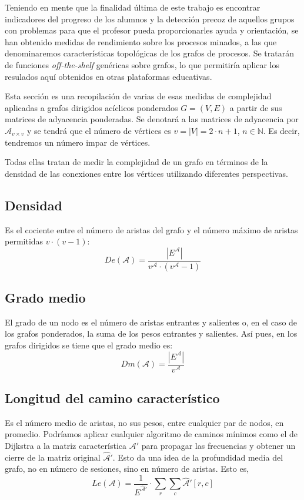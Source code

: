 Teniendo en mente que la finalidad última de este trabajo es encontrar indicadores del progreso de los alumnos y la detección precoz de aquellos grupos con problemas para que el profesor pueda proporcionarles ayuda y orientación, se han obtenido medidas de rendimiento sobre los procesos minados, a las que denominaremos características topológicas de los grafos de procesos. Se tratarán de funciones \emph{off-the-shelf} genéricas sobre grafos, lo que permitiría aplicar los resulados aquí obtenidos en otras plataformas educativas.

Esta sección es una recopilación de varias de esas medidas de complejidad \cite{cormen2022introduction} aplicadas a grafos dirigidos acíclicos ponderados $G = (V,E)$ a partir de sus matrices de adyacencia ponderadas. Se denotará a las matrices de adyacencia por $\mathcal{A}_{v\times v}$ y se tendrá que el número de vértices es $v = |V| = 2\cdot n + 1$, $n \in \mathbb{N}$. Es decir, tendremos un número impar de vértices.

Todas ellas tratan de medir la complejidad de un grafo en términos de la densidad de las conexiones entre los vértices utilizando diferentes perspectivas.

\subsection{Densidad}
Es el cociente entre el número de aristas del grafo y el número máximo de aristas permitidas $v \cdot (v-1)$:
\begin{equation}
De(\mathcal{A}) = \frac{|E^{\mathcal{A}}|}{v^{\mathcal{A}}\cdot (v^{\mathcal{A}}-1)}
\end{equation}
\subsection{Grado medio}
El grado de un nodo es el número de aristas entrantes y salientes o, en el caso de los grafos ponderados, la suma de los pesos entrantes y salientes. Así pues, en los grafos dirigidos se tiene que el grado medio es:
\begin{equation}
Dm(\mathcal{A}) = \frac{|E^{\mathcal{A}}|}{v^{\mathcal{A}}}
\end{equation}
\subsection{Longitud del camino característico}
Es el número medio de aristas, no sus pesos, entre cualquier par de nodos, en promedio. Podríamos aplicar cualquier algoritmo de caminos mínimos como el de Dijkstra \cite{cormen2022introduction} a la matriz característica $\mathcal{A}'$ para propagar las frecuencias y obtener un cierre de la matriz original $\hat{\mathcal{A}}'$. Esto da una idea de la profundidad media del grafo, no en número de sesiones, sino en número de aristas. Esto es,
\begin{equation}
Le(\mathcal{A}) = \frac{1}{E^{\hat{\mathcal{A}}'}} \cdot \sum_r \sum_c \hat{\mathcal{A}}'[r,c]
\end{equation}
